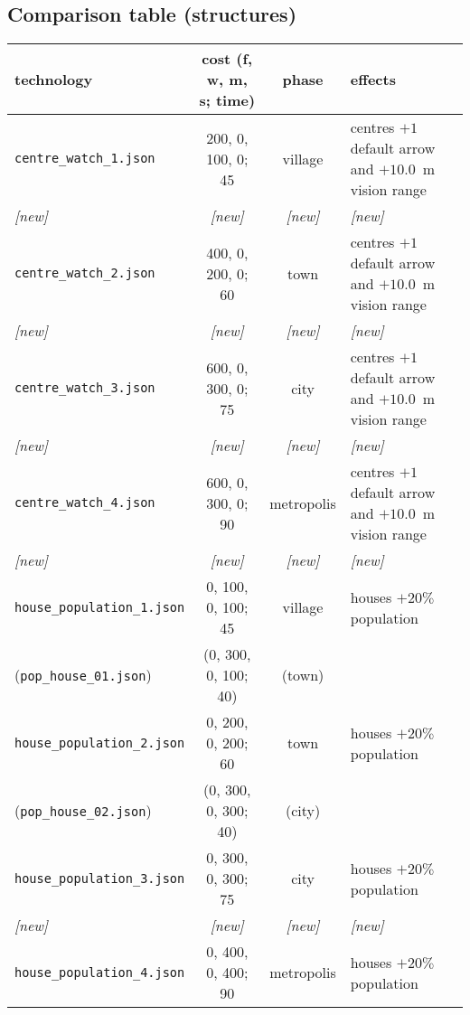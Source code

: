 \documentclass{article}
\begin{document}
\subsection{Comparison table (structures)}
\begin{tabular}{l|cc|l}
{\bf technology} & {{\bf cost} (f, w, m, s; time)} & {\bf phase} & {\bf effects} \\
\hline
\verb+centre_watch_1.json+                   &   200,    0,  100,    0;  45  & village    & centres $+1$ default arrow and $+10.0$~m vision range\\
\emph{[new]} & \emph{[new]} & \emph{[new]} & \emph{[new]} \\
\hline
\verb+centre_watch_2.json+                   &   400,    0,  200,    0;  60  & town       & centres $+1$ default arrow and $+10.0$~m vision range \\
\emph{[new]} & \emph{[new]} & \emph{[new]} & \emph{[new]} \\
\hline
\verb+centre_watch_3.json+                   &   600,    0,  300,    0;  75  & city       & centres $+1$ default arrow and $+10.0$~m vision range \\
\emph{[new]} & \emph{[new]} & \emph{[new]} & \emph{[new]} \\
\hline
\verb+centre_watch_4.json+                   &   600,    0,  300,    0;  90  & metropolis & centres $+1$ default arrow and $+10.0$~m vision range \\
\emph{[new]} & \emph{[new]} & \emph{[new]} & \emph{[new]} \\
\hline
\verb+house_population_1.json+               &     0,  100,    0,  100;  45  & village    & houses $+20\%$ population \\
(\verb+pop_house_01.json+)                   &    (0,  300,    0,  100;  40) & (town)     &  \\
\hline
\verb+house_population_2.json+               &     0,  200,    0,  200;  60  & town       & houses $+20\%$ population \\
(\verb+pop_house_02.json+)                   &    (0,  300,    0,  300;  40) & (city)     &  \\
\hline
\verb+house_population_3.json+               &     0,  300,    0,  300;  75  & city       & houses $+20\%$ population \\
\emph{[new]} & \emph{[new]} & \emph{[new]} & \emph{[new]} \\
\hline
\verb+house_population_4.json+               &     0,  400,    0,  400;  90  & metropolis & houses $+20\%$ population \\

\end{tabular}
\end{document}
